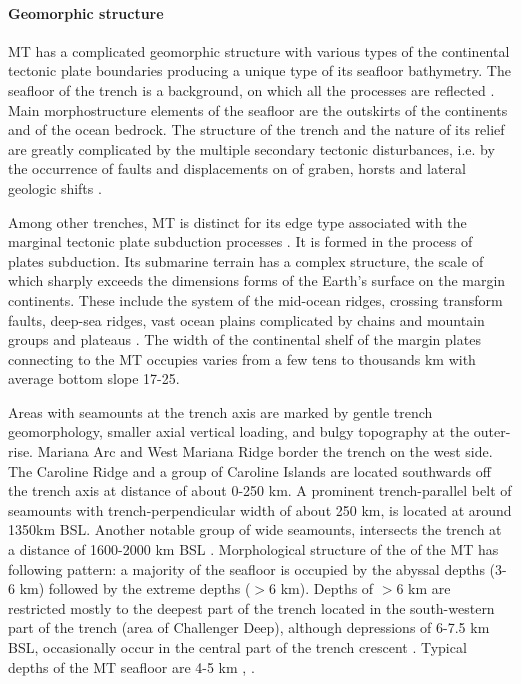 \documentclass[11pt,a4paper]{report}
\begin{document}
\paragraph{Geomorphic structure}
\ac{MT} has a complicated geomorphic structure with various types of the continental tectonic plate boundaries producing a unique type of its seafloor bathymetry. The seafloor of the trench is a background, on which all the processes are reflected \cite{Dic1974}. Main morphostructure elements of the seafloor are the outskirts of the continents and of the ocean bedrock. The structure of the trench and the nature of its relief are greatly complicated by the multiple secondary tectonic disturbances, i.e. by the occurrence of faults and displacements on of graben, horsts and lateral geologic shifts \cite{Lisicynetal1990}. 

Among other trenches, \ac{MT} is distinct for its edge type associated with the marginal tectonic plate subduction processes \cite{Boutelieretal2014}. It is formed in the process of plates subduction. Its submarine terrain has a complex structure, the scale of which sharply exceeds the dimensions forms of the Earth's surface on the margin continents. These include the system of the mid-ocean ridges, crossing transform faults, deep-sea ridges, vast ocean plains complicated by chains and mountain groups and plateaus \cite{Jarrard1986}. The width of the continental shelf of the margin plates connecting to the \ac{MT} occupies varies from a few tens to thousands km with average bottom slope 17-25\degree\space \cite{PushharovskijMelanholina1992}.

Areas with seamounts at the trench axis are marked by gentle trench geomorphology, smaller axial vertical loading, and bulgy topography at the outer-rise. Mariana Arc and West Mariana Ridge border the trench on the west side. The Caroline Ridge and a group of Caroline Islands are located southwards off the trench axis at distance of about 0-250 km. A prominent trench-parallel belt of seamounts with trench-perpendicular width of about 250 km, is located at around 1350km \ac{BSL}. Another notable group of wide seamounts, intersects the trench at a distance of 1600-2000 km \ac{BSL} \cite{Zhangetal2014}. Morphological structure of the of the \ac{MT} has following pattern: a majority of the seafloor is occupied by the abyssal depths (3-6 km) followed by the extreme depths ($>6$ km). Depths of $>6$ km are restricted mostly to the deepest part of the trench located in the south-western part of the trench (area of Challenger Deep), although depressions of 6-7.5 km \ac{BSL}, occasionally occur in the central part of the trench crescent \cite{Morgan1974}. Typical depths of the \ac{MT} seafloor are 4-5 km \cite{Lemenkova201991}, \cite{Lemenkova201989}.
\end{document}
